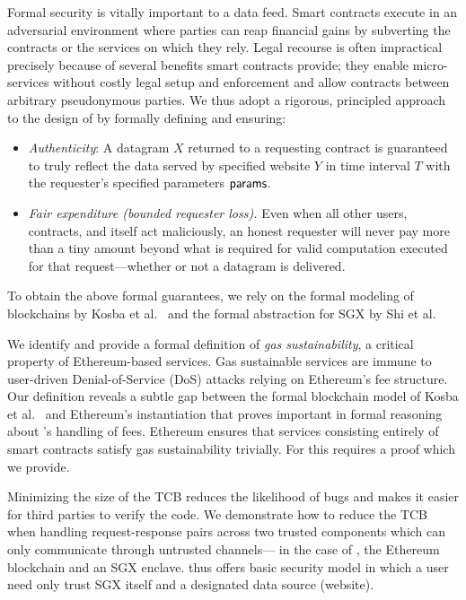 \vspace{1ex}
Formal security is vitally important to a data feed.
Smart contracts execute in an adversarial environment where parties can reap financial gains by subverting the contracts or the services on which they rely.
Legal recourse is often impractical precisely because of several benefits smart contracts provide;
they enable micro-services without costly legal setup and enforcement and allow contracts between arbitrary pseudonymous parties.
We thus adopt a rigorous, principled approach to the design of \tcs by formally defining and ensuring:

\begin{itemize}[leftmargin=5mm]
\item
  \setlength{\itemsep}{2pt}
  \setlength{\parskip}{0pt}
  \setlength{\parsep}{0pt}
{\it Authenticity}: A datagram $X$ returned
to a requesting contract is guaranteed
to truly reflect the data served by specified website $Y$ in time interval $T$ with the requester's specified parameters ${\sf params}$.
\item
{\it Fair expenditure (bounded requester loss).}
Even when all other users, contracts, and \tc itself act maliciously,
an honest requester will never pay more than a tiny amount beyond what is required for valid computation executed for that request---whether or not a datagram is delivered.
\end{itemize}

To obtain the above formal guarantees, we rely on the formal modeling
of blockchains by Kosba et al.~\cite{hawk} and the formal abstraction for SGX by Shi et al.~\cite{sgxsok}

\vspace{1ex}
We identify and provide a formal definition of \emph{gas sustainability}, a critical property of Ethereum-based services.
Gas sustainable services are immune to user-driven Denial-of-Service (DoS) attacks relying on Ethereum's fee structure.
Our definition reveals a subtle gap between the formal blockchain model of Kosba et al.~\cite{hawk}
and Ethereum's instantiation that proves important in formal reasoning about \tc's handling of fees.
Ethereum ensures that services consisting entirely of smart contracts satisfy gas sustainability trivially.
For \tc this requires a proof which we provide.

\vspace{1ex}
Minimizing the size of the TCB reduces the likelihood of bugs and makes it easier for third parties to verify the code.
We demonstrate how to reduce the TCB when handling request-response pairs across two trusted components which can only communicate through untrusted channels---%
in the case of \tc, the Ethereum blockchain and an SGX enclave.
\tc thus offers basic security model in which a user need only trust SGX itself and a designated data source (website).

